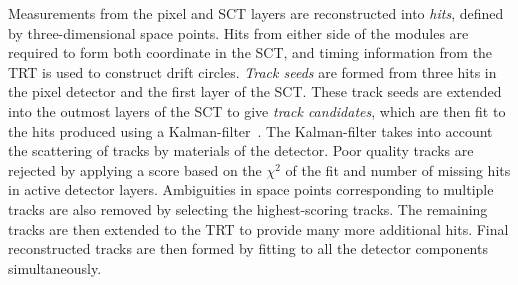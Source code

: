 Measurements from the pixel and SCT layers are reconstructed into \emph{hits}, defined by three-dimensional space points. Hits from either side of the modules are required to form both coordinate in the SCT, and timing information from the TRT is used to construct drift circles. \emph{Track seeds} are formed from three hits in the pixel detector and the first layer of the SCT. These track seeds are extended into the outmost layers of the SCT to give \emph{track candidates}, which are then fit to the hits produced using a Kalman-filter~\cite{ATLAS:tracking,ATLAS:Kalman}. The Kalman-filter takes into account the scattering of tracks by materials of the detector. Poor quality tracks are rejected by applying a score based on the $\chi^2$ of the fit and number of missing hits in active detector layers. Ambiguities in space points corresponding to multiple tracks are also removed by selecting the highest-scoring tracks. The remaining tracks are then extended to the TRT to provide many more additional hits. Final reconstructed tracks are then formed by fitting to all the detector components simultaneously. 

